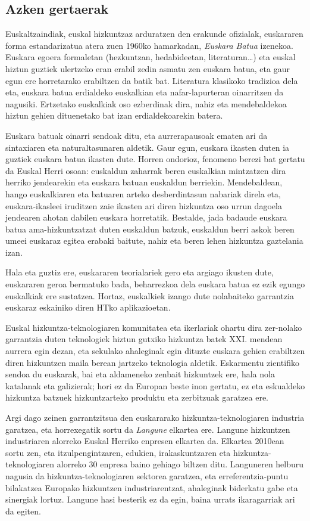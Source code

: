 \begin{multicols}{2}
\subsection{Azken gertaerak}
    Euskaltzaindiak, euskal hizkuntzaz arduratzen den erakunde ofizialak, euskararen forma estandarizatua atera zuen 1960ko hamarkadan, \textit{Euskara Batua} izenekoa. Euskara egoera formaletan (hezkuntzan, hedabideetan, literaturan…) eta euskal hiztun guztiek ulertzeko eran erabil zedin asmatu zen euskara batua, eta gaur egun ere horretarako erabiltzen da batik bat. Literatura klasikoko tradizioa dela eta, euskara batua erdialdeko euskalkian eta nafar-lapurteran oinarritzen da nagusiki. Ertzetako euskalkiak oso ezberdinak dira, nahiz eta mendebaldekoa hiztun gehien dituenetako bat izan erdialdekoarekin batera.

Euskara batuak oinarri sendoak ditu, eta aurrerapausoak ematen ari da sintaxiaren eta naturaltasunaren aldetik. Gaur egun, euskara ikasten duten ia guztiek euskara batua ikasten dute. Horren ondorioz, fenomeno berezi bat gertatu da Euskal Herri osoan: euskaldun zaharrak beren euskalkian mintzatzen dira herriko jendearekin eta euskara batuan euskaldun berriekin. Mendebaldean, hango euskalkiaren eta batuaren arteko desberdintasun nabariak direla eta, euskara-ikasleei iruditzen zaie ikasten ari diren hizkuntza oso urrun dagoela jendearen ahotan dabilen euskara horretatik. Bestalde, jada badaude euskara batua ama-hizkuntzatzat duten euskaldun batzuk, euskaldun berri askok beren umeei euskaraz egitea erabaki baitute, nahiz eta beren lehen hizkuntza gaztelania izan. 

Hala eta guztiz ere, euskararen teorialariek \cite{BAS-Nota9}  gero eta argiago ikusten dute, euskararen geroa bermatuko bada, beharrezkoa dela euskara batua ez ezik egungo euskalkiak ere sustatzea. Hortaz, euskalkiek izango dute nolabaiteko garrantzia euskaraz eskainiko diren HTko aplikazioetan.

Euskal hizkuntza-teknologiaren komunitatea eta ikerlariak ohartu dira zer-nolako garrantzia duten teknologiek hiztun gutxiko hizkuntza batek XXI. mendean aurrera egin dezan, eta sekulako ahaleginak egin dituzte euskara gehien erabiltzen diren hizkuntzen maila berean jartzeko teknologia aldetik. Eskarmentu zientifiko sendoa du euskarak, bai eta aldameneko zenbait hizkuntzek ere, hala nola katalanak eta galizierak; hori ez da Europan beste inon gertatu, ez eta eskualdeko hizkuntza batzuek hizkuntzarteko produktu eta zerbitzuak garatzea ere.

Argi dago zeinen garrantzitsua den euskararako hizkuntza-teknologiaren industria garatzea, eta horrexegatik sortu da \textit{Langune} \cite{BAS-Nota10}  elkartea ere. Langune hizkuntzen industriaren alorreko Euskal Herriko enpresen elkartea da. Elkartea 2010ean sortu zen, eta itzulpengintzaren, edukien, irakaskuntzaren eta hizkuntza-teknologiaren alorreko 30 enpresa baino gehiago biltzen ditu. Languneren helburu nagusia da hizkuntza-teknologiaren sektorea garatzea, eta erreferentzia-puntu bilakatzea Europako hizkuntzen industriarentzat, ahaleginak biderkatu gabe eta sinergiak lortuz. Langune hasi besterik ez da egin, baina urrats ikaragarriak ari da egiten.


\end{multicols}
